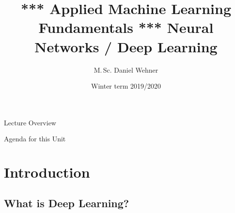 


\title[Deep Learning]{*** Applied Machine Learning Fundamentals *** Neural Networks / Deep Learning}
\author{M.\,Sc. Daniel Wehner}
\date{Winter term 2019/2020}




\maketitlepage


\begin{frame}{Lecture Overview}{}
\end{frame}


\begin{frame}{Agenda for this Unit}
	\begin{multicols}{2}
		\tableofcontents
	\end{multicols}
\end{frame}


\section{Introduction}

\subsection{What is Deep Learning?}

